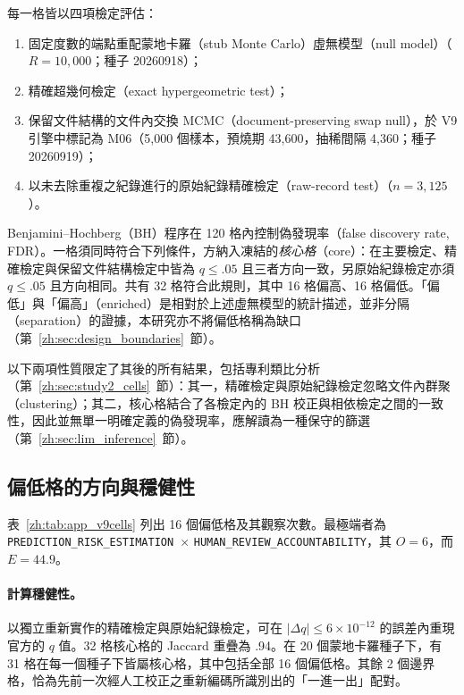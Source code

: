 每一格皆以四項檢定評估：
\begin{enumerate}
  \item 固定度數的端點重配蒙地卡羅（stub Monte Carlo）虛無模型（null model）（$R = 10{,}000$；種子 20260918）；
  \item 精確超幾何檢定（exact hypergeometric test）；
  \item 保留文件結構的文件內交換 MCMC（document-preserving swap null），於 V9 引擎中標記為 M06（5,000 個樣本，預燒期 43,600，抽稀間隔 4,360；種子 20260919）；
  \item 以未去除重複之紀錄進行的原始紀錄精確檢定（raw-record test）（$n = 3{,}125$）。
\end{enumerate}
Benjamini--Hochberg（BH）程序在 120 格內控制偽發現率（false discovery rate, FDR）\citep{benjamini1995controlling}。一格須同時符合下列條件，方納入凍結的\emph{核心格}（core）：在主要檢定、精確檢定與保留文件結構檢定中皆為 $q \le .05$ 且三者方向一致，另原始紀錄檢定亦須 $q \le .05$ 且方向相同。共有 32 格符合此規則，其中 16 格偏高、16 格偏低。「偏低」與「偏高」（enriched）是相對於上述虛無模型的統計描述，並非分隔（separation）的證據，本研究亦不將偏低格稱為缺口（第~\ref{zh:sec:design_boundaries}~節）。

以下兩項性質限定了其後的所有結果，包括專利類比分析（第~\ref{zh:sec:study2_cells}~節）：其一，精確檢定與原始紀錄檢定忽略文件內群聚（clustering）；其二，核心格結合了各檢定內的 BH 校正與相依檢定之間的一致性，因此並無單一明確定義的偽發現率，應解讀為一種保守的篩選（第~\ref{zh:sec:lim_inference}~節）。

\subsection{偏低格的方向與穩健性}
\label{zh:sec:study1_direction}

表~\ref{zh:tab:app_v9cells} 列出 16 個偏低格及其觀察次數。最極端者為 \texttt{PREDICTION\_\allowbreak RISK\_\allowbreak ESTIMATION}~$\times$ \texttt{HUMAN\_\allowbreak REVIEW\_\allowbreak ACCOUNTABILITY}，其 $O = 6$，而 $E = 44.9$。

\paragraph{計算穩健性。} 以獨立重新實作的精確檢定與原始紀錄檢定，可在 $|\Delta q| \le 6\times10^{-12}$ 的誤差內重現官方的 $q$ 值。32 格核心格的 Jaccard 重疊為 .94。在 20 個蒙地卡羅種子下，有 31 格在每一個種子下皆屬核心格，其中包括全部 16 個偏低格。其餘 2 個邊界格，恰為先前一次經人工校正之重新編碼所識別出的「一進一出」配對。

